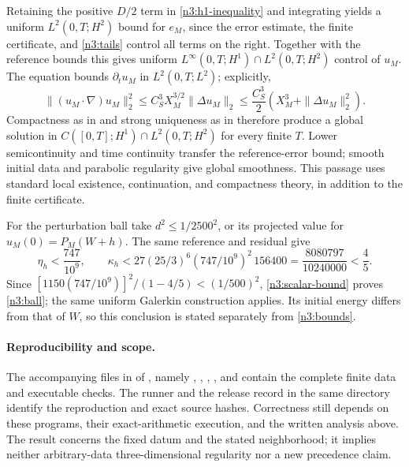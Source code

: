 Retaining the positive $D/2$ term in \eqref{n3:h1-inequality} and
integrating yields a uniform $L^2(0,T;H^2)$ bound for $e_M$, since the
error estimate, the finite certificate, and \eqref{n3:tails} control all
terms on the right. Together with the reference bounds this gives uniform
$L^\infty(0,T;H^1)\cap L^2(0,T;H^2)$ control of $u_M$.
The equation bounds $\partial_tu_M$ in $L^2(0,T;L^2)$; explicitly,
\[
 \|(u_M\cdot\nabla)u_M\|_2^2
 \le C_S^3 X_M^{3/2}\|\Delta u_M\|_2
 \le\frac{C_S^3}{2}(X_M^3+\|\Delta u_M\|_2^2).
\]
Compactness as in \cite[Corollary~4]{Simon} and strong uniqueness as in
\cite[Proposition~2.2]{Tao2009} therefore produce a
global solution in $C([0,T];H^1)\cap L^2(0,T;H^2)$ for every finite $T$.
Lower semicontinuity and time continuity transfer the reference-error
bound; smooth initial data and parabolic regularity give global smoothness.
This passage uses standard local existence, continuation, and compactness
theory, in addition to the finite certificate.

For the perturbation ball take $d^2\le1/2500^2$, or its projected value
for $u_M(0)=P_M(W+h)$. The same reference and residual give
\[
 \eta_h<\frac{747}{10^9},\qquad
 \kappa_h<27(25/3)^6(747/10^9)^2\,156400
   =\frac{8080797}{10240000}<\frac45.
\]
Since $[1150(747/10^9)]^2/(1-4/5)<(1/500)^2$,
\eqref{n3:scalar-bound} proves \eqref{n3:ball}; the same uniform
Galerkin construction applies. Its initial energy differs from that of
$W$, so this conclusion is stated separately from \eqref{n3:bounds}.

\paragraph{Reproducibility and scope.}
The accompanying files in  of , namely
,
, ,
, and 
contain the complete finite data and executable checks.
The runner  and the release record
 in the same directory identify the
reproduction and exact source hashes. Correctness still depends on
these programs, their exact-arithmetic execution, and the written analysis
above. The result concerns the fixed datum and the stated neighborhood;
it implies neither arbitrary-data three-dimensional regularity nor a
new precedence claim.
